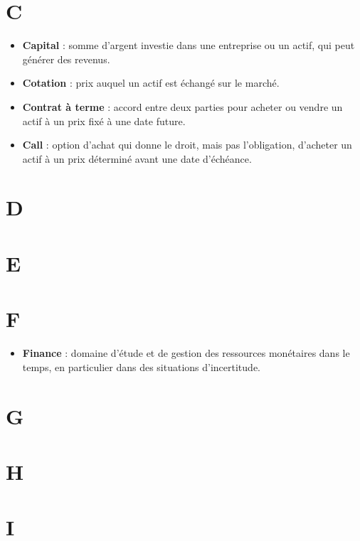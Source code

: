 \documentclass[a4paper,10pt]{article}
\begin{document}
\begin{multicols}{2}
\section*{C}
\begin{itemize}
  \item \textbf{Capital} : somme d’argent investie dans une entreprise ou un actif, qui peut générer des revenus.
  \item \textbf{Cotation} : prix auquel un actif est échangé sur le marché.
  \item \textbf{Contrat à terme} : accord entre deux parties pour acheter ou vendre un actif à un prix fixé à une date future.
  \item \textbf{Call} : option d’achat qui donne le droit, mais pas l’obligation, d’acheter un actif à un prix déterminé avant une date d’échéance.
\end{itemize}

\section*{D}

\section*{E}

\section*{F}
\begin{itemize}
  \item \textbf{Finance} : domaine d’étude et de gestion des ressources monétaires dans le temps, en particulier dans des situations d’incertitude.
\end{itemize}

\section*{G}

\section*{H}

\section*{I}


\end{multicols}
\end{document}
